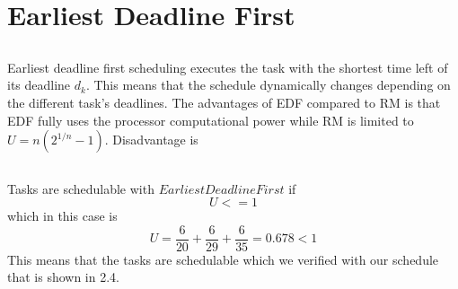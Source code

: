 \documentclass[12pt,a4paper]{article}
\begin{document}
\section{Earliest Deadline First} %
\subsection{}
Earliest deadline first scheduling executes the task with the shortest time left of its deadline $d_k$. This means that the schedule dynamically changes depending on the different task's deadlines. The advantages of EDF compared to RM is that EDF fully uses the processor computational power while RM is limited to $U=n(2^{1/n}-1)$. Disadvantage is 

\subsection{} %
Tasks are schedulable with $Earliest Deadline First$ if 
\begin{equation}
U <= 1
\end{equation}
which in this case is
\begin{equation}
  U = \frac{6}{20}+\frac{6}{29}+\frac{6}{35}=0.678 < 1
\end{equation}
This means that the tasks are schedulable which we verified with our schedule that is shown in 2.4.
\end{document}
